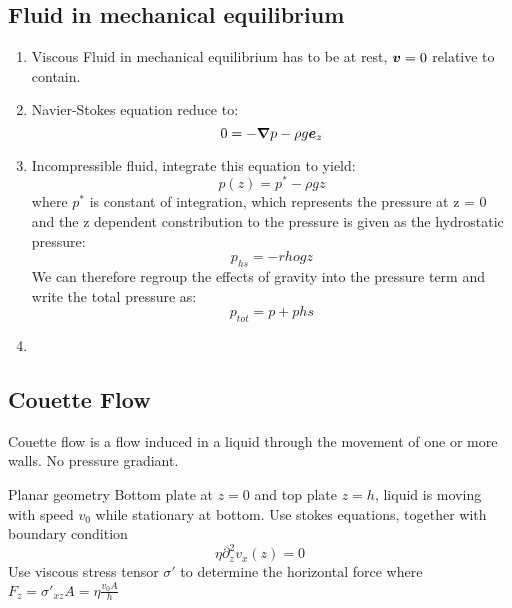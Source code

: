 \documentclass[12pt,a4paper]{article}
\begin{document}
        \subsection{Fluid in mechanical equilibrium}
            \begin{enumerate}
                \item Viscous Fluid in mechanical equilibrium has to be at rest, $\vb*{v}=0$ relative to contain.
                \item Navier-Stokes equation reduce to:
                \begin{equation}
                    0 = -\grad{p} -\rho g \vb*{e}_z
                \end{equation}
                \item Incompressible fluid, integrate this equation to yield:
                \begin{equation}
                    p(z) = p^{*} - \rho g z
                \end{equation}
                where $p^{*}$ is constant of integration, which represents the pressure at z = 0 and the z dependent constribution to the pressure is given as the hydrostatic pressure:
                \begin{equation}
                    p_{hs} = - rho gz
                \end{equation}
                We can therefore regroup the effects of gravity into the pressure term and write the total pressure as:
                \begin{equation}
                    p_{tot} = p + p{hs}
                \end{equation}
                \item 
            \end{enumerate}
        \subsection{Couette Flow}
            Couette flow is  a flow induced in a liquid through the movement of one or more walls. No pressure gradiant.  
            \begin{example}
                {Planar geometry}{
                    Bottom plate at $z=0$ and top plate $z=h$, liquid is moving with speed $v_0$ while stationary at bottom.
                    Use stokes equations, together with boundary condition
                    \begin{equation}
                        \eta \partial^2_z v_x(z) = 0
                    \end{equation}
                    Use viscous stress tensor $\sigma '$ to determine the horizontal force where $F_z=\sigma '_{xz}A = \eta \frac{v_0 A}{h}$
                }
            \end{example}
\end{document}
